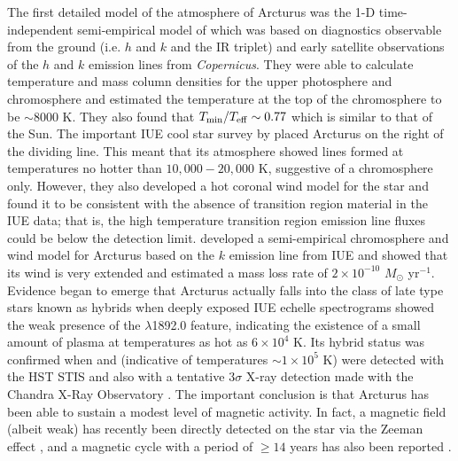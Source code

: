 The first detailed model of the atmosphere of Arcturus was the 1-D time-independent semi-empirical model of \cite{ayres_1975} which was based on diagnostics observable from the ground (i.e.  $h$ and $k$ and the  IR triplet) and early satellite observations of the  $h$ and $k$ emission lines from \textit{Copernicus}. They were able to calculate temperature and mass column densities for the upper photosphere and chromosphere and estimated the temperature at the top of the chromosphere to be $\sim 8000$ K. They also found that $T_{\rm{min}}/T_{\rm{eff}} \sim 0.77$ which is similar to that of the Sun. The important IUE cool star survey by \cite{linsky_1979} placed Arcturus on the right of the dividing line. This meant that its atmosphere showed lines formed at temperatures no hotter than $10,000 - 20,000$ K, suggestive of a chromosphere only. However, they also developed a hot coronal wind model for the star and found it to be consistent with the absence of transition region material in the IUE data; 	that is, the high temperature transition region emission line fluxes could be below the detection limit. \cite{drake_1985} developed a semi-empirical chromosphere and wind model for Arcturus based on the  $k$ emission line from IUE and showed that its wind is very extended and estimated a mass loss rate of $2\times 10^{-10}$ $M_{\odot}$ yr$^{-1}$. Evidence began to emerge that Arcturus actually falls into the class of late type stars known as hybrids when deeply exposed IUE echelle spectrograms showed the weak presence of the \ion{Si}{iii]} $\lambda$1892.0 feature, indicating the existence of a small amount of plasma at temperatures as hot as $6 \times 10^4$ K. Its hybrid status was confirmed when  and  (indicative of temperatures $\sim 1 \times 10^5$ K) were detected with the HST STIS and also with a tentative $3 \sigma$ X-ray detection made with the  Chandra X-Ray Observatory \citep{ayres_2003}. The important conclusion is that Arcturus has been able to sustain a modest level of magnetic activity. In fact,  a magnetic field (albeit weak) has recently been directly detected on the star via the Zeeman effect \citep{sennhauser_2011}, and a magnetic cycle with a period of $\geq 14$ years has also been reported \citep{brown_2008}.

